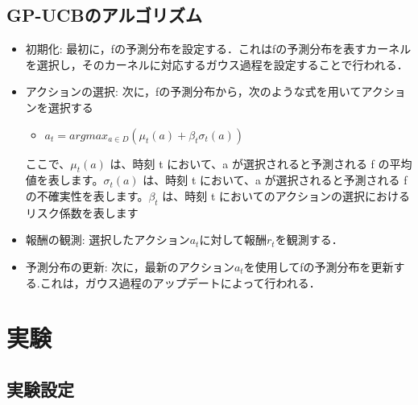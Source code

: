 \documentclass[dvipdfmx, 10.5pt]{beamer}
\begin{document}
\subsection{GP-UCBのアルゴリズム}
\begin{frame}{\insertsubsection}
	\begin{itemize}
		\item 初期化: 最初に，fの予測分布を設定する．これはfの予測分布を表すカーネルを選択し，そのカーネルに対応するガウス過程を設定することで行われる．
		\item アクションの選択: 次に，fの予測分布から，次のような式を用いてアクションを選択する
		\begin{itemize}
			\item $a_t = argmax_{a \in D} (\mu_t(a) + \beta_t \sigma_t(a))$
		\end{itemize}
		ここで、$\mu_t(a)$ は、時刻 t において、a が選択されると予測される f の平均値を表します。$\sigma_t(a)$ は、時刻 t において、a が選択されると予測される f の不確実性を表します。$\beta_t$ は、時刻 t においてのアクションの選択におけるリスク係数を表します
		\item 報酬の観測: 選択したアクション$a_t$に対して報酬$r_t$を観測する．
		\item 予測分布の更新: 次に，最新のアクション$a_t$を使用してfの予測分布を更新する.これは，ガウス過程のアップデートによって行われる．
	\end{itemize}

\end{frame}


\section{実験}

\subsection{実験設定}
\end{document}
